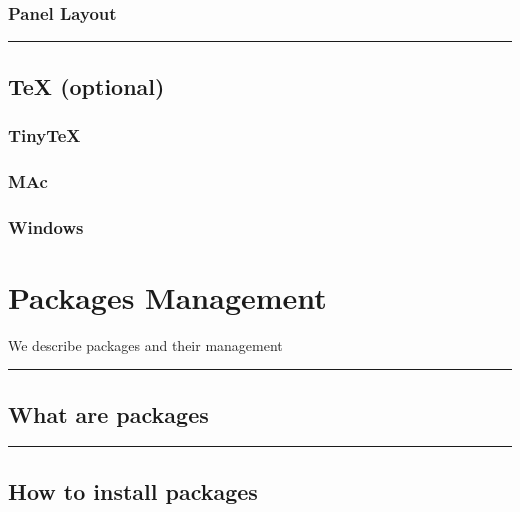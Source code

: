\documentclass[]{book}
\begin{document}
\subsection{Panel Layout}\label{panel-layout}

\begin{center}\rule{0.5\linewidth}{\linethickness}\end{center}

\section{TeX (optional)}\label{tex-optional}

\subsection{TinyTeX}\label{tinytex}

\subsection{MAc}\label{mac}

\subsection{Windows}\label{windows}

\chapter{Packages Management}\label{packages-management}

We describe packages and their management

\begin{center}\rule{0.5\linewidth}{\linethickness}\end{center}

\section{What are packages}\label{what-are-packages}

\begin{center}\rule{0.5\linewidth}{\linethickness}\end{center}

\section{How to install packages}\label{how-to-install-packages}
\end{document}
